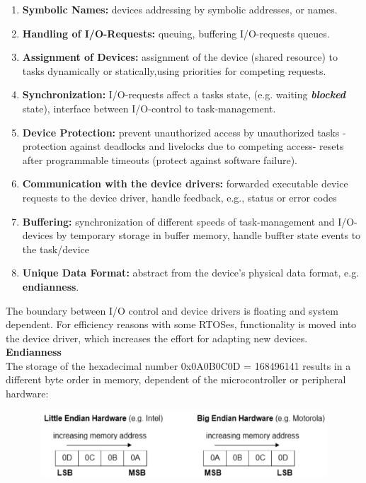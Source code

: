 \begin{enumerate}
	\item  \textbf{Symbolic Names: }devices addressing by symbolic addresses, or names.
	\item  \textbf{Handling of I/O-Requests: }queuing, buffering I/O-requests  queues.
	\item  \textbf{Assignment of Devices: }assignment of the device (shared resource) to tasks dynamically or 	statically,using priorities for competing requests. 

	\item  \textbf{Synchronization: }I/O-requests affect a tasks state, (e.g. waiting  \textbf{\textit{blocked}} state), interface between I/O-control to task-management.

	\item  \textbf{Device Protection: } prevent unauthorized access by unauthorized tasks - protection against deadlocks and livelocks due to competing access- resets after programmable timeouts (protect against software failure).

	\item  \textbf{Communication with the device drivers: }forwarded executable device requests to the device driver, handle feedback, e.g., status or error codes 

	\item  \textbf{Buffering: }synchronization of different speeds of task-management and I/O-devices by temporary storage in buffer memory, handle buffter state events to the task/device

	\item  \textbf{Unique Data Format: }abstract from the device's physical data format, e.g. \textbf{endianness}.
\end{enumerate}

The boundary between I/O control and device drivers is floating and system dependent. For efficiency reasons with some RTOSes, functionality is moved into the device driver, which increases the effort for adapting new devices.\\

{\rot\bf Endianness}\\

The storage of the hexadecimal number 0x0A0B0C0D = 168496141 results in a different byte order in memory, dependent of the microcontroller or peripheral hardware:

 	\begin{figure}[h]
    \centering
    \includegraphics[width=13cm, height=2.5cm]{Images/image120.png}
    \label{fig:Fig }
    \end{figure}

